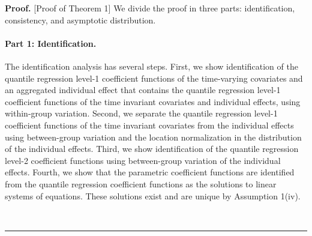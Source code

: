 \documentclass[12pt]{article}
\def\thetavec{\bm{\theta}}
\def\phivec{\bm{\phi}}
\def\H{\bm{H}}
\def\O{\bm{\Omega}}
\DeclareMathOperator{\ve}{vec}
\newtheorem{theorem}{Theorem}
\newenvironment{proof}[1][Proof]{\textbf{#1.} }{\ \rule{0.5em}{0.5em}}
\begin{document}
%

\begin{proof} [Proof of Theorem 1] %
%
We divide the proof in three parts: identification,  consistency, and asymptotic distribution.

\paragraph{Part 1: Identification.} The identification analysis has several steps. First, we show identification of the quantile regression level-1 coefficient functions of the time-varying covariates and an aggregated individual effect that contains the quantile regression level-1 coefficient functions of the time invariant covariates and individual effects, using within-group variation. Second, we separate the quantile regression level-1 coefficient functions of the time invariant covariates from the individual effects using between-group variation and the location normalization in the distribution of the individual effects. Third, we show identification of the quantile regression level-2 coefficient functions using between-group variation of the individual effects. Fourth, we show that the parametric coefficient functions are identified from the quantile regression coefficient functions as the solutions to linear systems of equations. These solutions exist and are unique by Assumption 1(iv).%


\end{proof}
\end{document}

